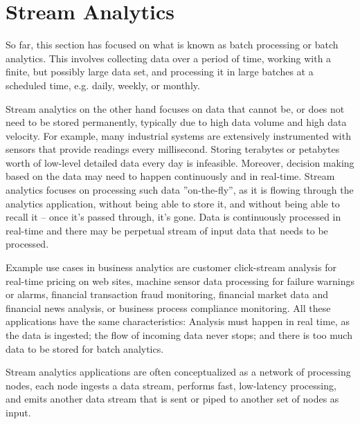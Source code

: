 \section{Stream Analytics}

So far, this section has focused on what is known as batch processing or batch analytics. This involves collecting data over a period of time, working with a finite, but possibly large data set, and processing it in large batches at a scheduled time, e.g. daily, weekly, or monthly.

Stream analytics on the other hand focuses on data that cannot be, or does not need to be stored permanently, typically due to high data volume and high data velocity. For example, many industrial systems are extensively instrumented with sensors that provide readings every millisecond. Storing terabytes or petabytes worth of low-level detailed data every day is infeasible. Moreover, decision making based on the data may need to happen continuously and in real-time. Stream analytics focuses on processing such data ''on-the-fly'', as it is flowing through the analytics application, without being able to store it, and without being able to recall it -- once it's passed through, it's gone. Data is continuously processed in real-time and there may be perpetual stream of input data that needs to be processed. 

Example use cases in business analytics are customer click-stream analysis for real-time pricing on web sites, machine sensor data processing for failure warnings or alarms, financial transaction fraud monitoring, financial market data and financial news analysis, or business process compliance monitoring. All these applications have the same characteristics: Analysis must happen in real time, as the data is ingested; the flow of incoming data never stops; and there is too much data to be stored for batch analytics.

Stream analytics applications are often conceptualized as a network of processing nodes, each node ingests a data stream, performs fast, low-latency processing, and emits another data stream that is sent or piped to another set of nodes as input.

